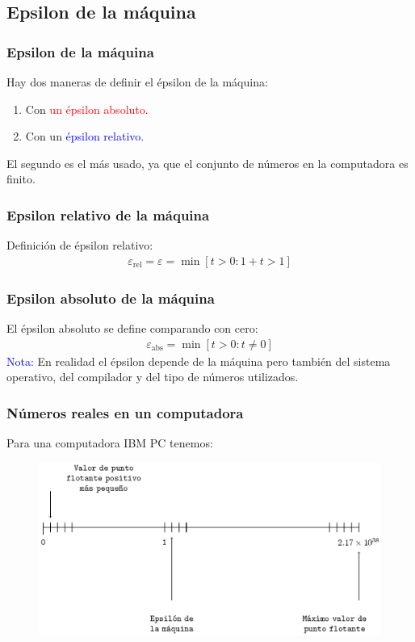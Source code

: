 \documentclass[12pt]{beamer}
\begin{document}
\subsection{Epsilon de la máquina}

\begin{frame}
\frametitle{Epsilon de la máquina}
Hay dos maneras de definir el épsilon de la máquina:
\begin{enumerate}[<+->]
\item Con \textcolor{red}{un épsilon absoluto}.
\item Con un \textcolor{blue}{épsilon relativo}.
\end{enumerate}
\pause 
El segundo es el más usado, ya que el conjunto de números en la computadora es finito.
\end{frame}
\begin{frame}
\frametitle{Epsilon relativo de la máquina}
Definición de épsilon relativo:
\pause
\begin{align*}
\varepsilon_{\text{rel}} = \varepsilon = \min[ t > 0 : 1 + t > 1]
\end{align*}
\end{frame}
\begin{frame}
\frametitle{Epsilon absoluto de la máquina}
El épsilon absoluto se define comparando con cero:
\pause
\begin{align*}
\varepsilon_{\text{abs}} = \min[t > 0 : t \neq 0]
\end{align*}
\pause
\textcolor{blue}{Nota: } En realidad el épsilon depende de la máquina pero también del sistema operativo, del compilador y del tipo de números utilizados.
\end{frame}
\begin{frame}
\frametitle{Números reales en un computadora}
Para una computadora IBM PC tenemos:
\begin{figure}
	\centering
	\includegraphics[scale=0.75]{Imagenes/epsilonmaquina.eps}
\end{figure}
\end{frame}
\end{document}
